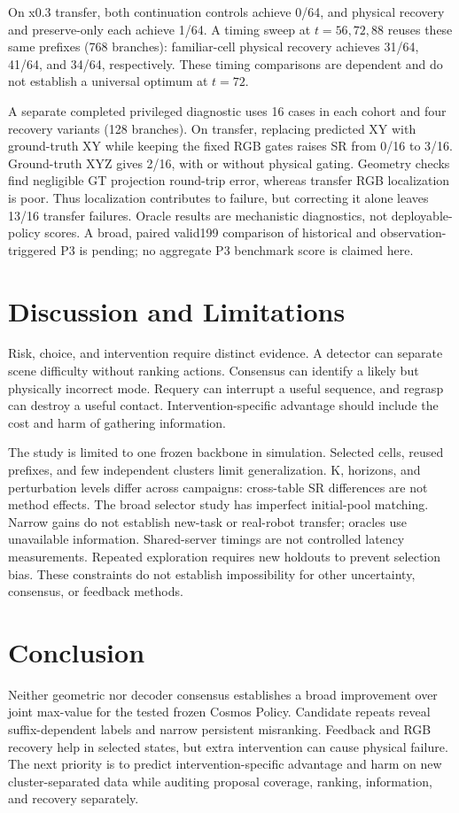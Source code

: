 \documentclass{article}
\begin{document}
On x0.3 transfer, both continuation controls achieve 0/64, and physical
recovery and preserve-only each achieve 1/64. A timing sweep at $t=56,72,88$
reuses these same prefixes (768 branches): familiar-cell physical recovery
achieves 31/64, 41/64, and 34/64, respectively. These timing comparisons
are dependent and do not establish a universal optimum at $t=72$.

A separate completed privileged diagnostic uses 16 cases in each cohort
and four recovery variants (128 branches). On transfer, replacing predicted
XY with ground-truth XY while keeping the fixed RGB gates raises SR from
0/16 to 3/16. Ground-truth XYZ gives 2/16, with or without physical gating.
Geometry checks find negligible GT projection round-trip error, whereas
transfer RGB localization is poor. Thus localization contributes to failure,
but correcting it alone leaves 13/16 transfer failures. Oracle results are
mechanistic diagnostics, not deployable-policy scores. A broad, paired
valid199 comparison of historical and observation-triggered P3 is pending;
no aggregate P3 benchmark score is claimed here.

\section{Discussion and Limitations}
Risk, choice, and intervention require distinct evidence. A detector can
separate scene difficulty without ranking actions. Consensus can identify a
likely but physically incorrect mode. Requery can interrupt a useful sequence,
and regrasp can destroy a useful contact. Intervention-specific advantage
should include the cost and harm of gathering information.

The study is limited to one frozen backbone in simulation. Selected cells,
reused prefixes, and few independent clusters limit generalization.
K, horizons, and perturbation levels differ across campaigns: cross-table SR
differences are not method effects. The broad selector study has imperfect
initial-pool matching. Narrow gains do not establish new-task or real-robot
transfer; oracles use unavailable information. Shared-server timings are not
controlled latency measurements. Repeated exploration requires new holdouts
to prevent selection bias. These constraints do not establish impossibility
for other uncertainty, consensus, or feedback methods.

\section{Conclusion}
Neither geometric nor decoder consensus establishes a broad improvement
over joint max-value for the tested frozen Cosmos Policy. Candidate repeats
reveal suffix-dependent labels and narrow persistent misranking. Feedback
and RGB recovery help in selected states, but extra intervention can cause
physical failure. The next priority is to predict intervention-specific
advantage and harm on new cluster-separated data while auditing proposal
coverage, ranking, information, and recovery separately.
\label{sec:main_end}
\end{document}
